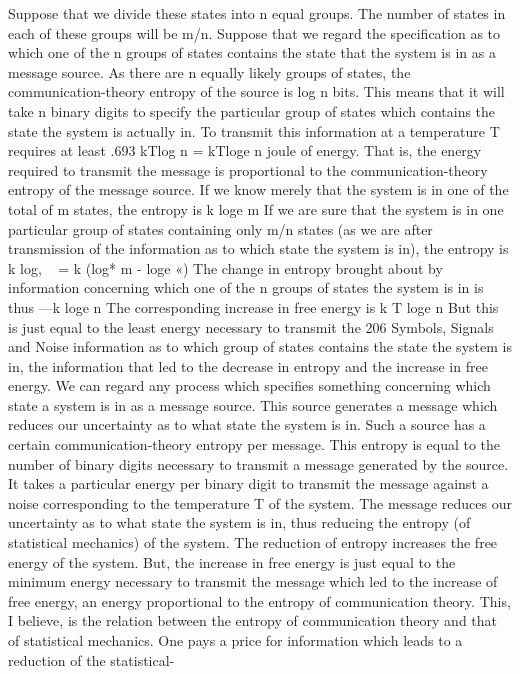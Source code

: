 {{{{{{{{{{{Suppose that we divide these states into n equal groups. The
number of states in each of these groups will be m/n.
Suppose that we regard the specification as to which one of the
n groups of states contains the state that the system is in as a
message source. As there are n equally likely groups of states, the
communication-theory entropy of the source is log n bits. This
means that it will take n binary digits to specify the particular
group of states which contains the state the system is actually in.
To transmit this information at a temperature T requires at least
.693 kTlog n = kTloge n
joule of energy. That is, the energy required to transmit the message
is proportional to the communication-theory entropy of the message
source.
If we know merely that the system is in one of the total of m
states, the entropy is
k loge m
If we are sure that the system is in one particular group of states
containing only m/n states (as we are after transmission of the
information as to which state the system is in), the entropy is
k log, ~ = k (log* m - loge «)
The change in entropy brought about by information concerning
which one of the n groups of states the system is in is thus
—k loge n
The corresponding increase in free energy is
k T loge n
But this is just equal to the least energy necessary to transmit the
206 Symbols, Signals and Noise
information as to which group of states contains the state the
system is in, the information that led to the decrease in entropy
and the increase in free energy.
We can regard any process which specifies something concerning
which state a system is in as a message source. This source
generates a message which reduces our uncertainty as to what state
the system is in. Such a source has a certain communication-theory
entropy per message. This entropy is equal to the number of binary
digits necessary to transmit a message generated by the source. It
takes a particular energy per binary digit to transmit the message
against a noise corresponding to the temperature T of the system.
The message reduces our uncertainty as to what state the system
is in, thus reducing the entropy (of statistical mechanics) of the
system. The reduction of entropy increases the free energy of the
system. But, the increase in free energy is just equal to the minimum
energy necessary to transmit the message which led to the
increase of free energy, an energy proportional to the entropy of
communication theory.
This, I believe, is the relation between the entropy of communication
theory and that of statistical mechanics. One pays a price
for information which leads to a reduction of the statistical-
}}}}}}}}}}}
